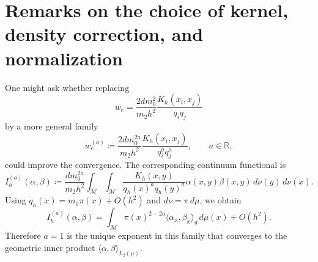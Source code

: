 \documentclass[a4paper,11pt, DIV=10]{scrartcl}
\numberwithin{equation}{section}
\theoremstyle{definition}
\theoremstyle{remark}
\newcommand{\R}{\mathbb{R}}
\newcommand{\mc}[1]{\mathcal{#1}}
\begin{document}
\section{Remarks on the choice of kernel, density correction, and normalization}
\label{sec:KernelRemarks}
One might ask whether replacing
\begin{equation}
w_e=\frac{2dm_0^2}{m_2h^2}\frac{K_h(x_i,x_j)}{q_iq_j}
\end{equation}
by a more general family
\begin{equation}
w_e^{(a)}\coloneq \frac{2dm_0^{2a}}{m_2h^2}\frac{K_h(x_i,x_j)}{q_i^a q_j^a},
\qquad a\in\R,
\end{equation}
could improve the convergence.
The corresponding continuum functional is
\begin{equation}
I_h^{(a)}(\alpha,\beta)
\coloneq
\frac{d m_0^{2a}}{m_2 h^2}
\int_{\mc{M}}\int_{\mc{M}}
\frac{K_h(x,y)}{q_h(x)^a q_h(y)^a}
\alpha(x,y)\beta(x,y)\,d\nu(y)\,d\nu(x).
\end{equation}
Using $q_h(x)=m_0\pi(x)+O(h^2)$ and $d\nu=\pi\,d\mu$, we obtain
\begin{equation}
I_h^{(a)}(\alpha,\beta)
=
\int_{\mc{M}} \pi(x)^{2-2a}\langle \alpha_x,\beta_x\rangle_g\,d\mu(x)
+ O(h^2).
\end{equation}
Therefore $a=1$ is the unique exponent in this family that converges to the geometric inner product $\langle \alpha,\beta\rangle_{L_2(\mu)}$.
\end{document}
